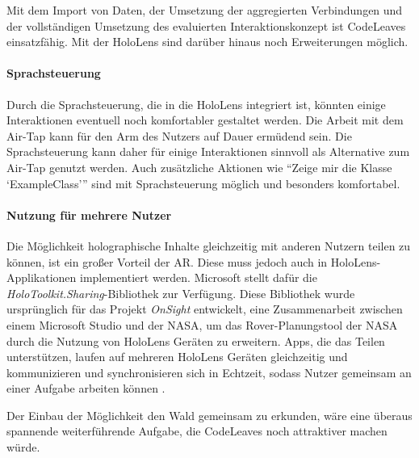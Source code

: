Mit dem Import von Daten, der Umsetzung der aggregierten Verbindungen und der vollständigen Umsetzung des evaluierten Interaktionskonzept ist CodeLeaves einsatzfähig. Mit der HoloLens sind darüber hinaus noch Erweiterungen möglich.

\paragraph*{Sprachsteuerung}

Durch die Sprachsteuerung, die in die HoloLens integriert ist, könnten einige Interaktionen eventuell noch komfortabler gestaltet werden. Die Arbeit mit dem Air-Tap kann für den Arm des Nutzers auf Dauer ermüdend sein. Die Sprachsteuerung kann daher für einige Interaktionen sinnvoll als Alternative zum Air-Tap genutzt werden. Auch zusätzliche Aktionen wie "`Zeige mir die Klasse \enquote*{ExampleClass}"' sind mit Sprachsteuerung möglich und besonders komfortabel.

\paragraph*{Nutzung für mehrere Nutzer}
Die Möglichkeit holographische Inhalte gleichzeitig mit anderen Nutzern teilen zu können, ist ein großer Vorteil der AR. Diese muss jedoch auch in HoloLens-Applikationen implementiert werden. Microsoft stellt dafür die \textit{HoloToolkit.Sharing}-Bibliothek zur Verfügung. Diese Bibliothek wurde ursprünglich für das Projekt \textit{OnSight} entwickelt, eine Zusammenarbeit zwischen einem Microsoft Studio und der NASA, um das Rover-Planungstool der NASA durch die Nutzung von HoloLens Geräten zu erweitern. Apps, die das Teilen unterstützen, laufen auf mehreren HoloLens Geräten gleichzeitig und kommunizieren und synchronisieren sich in Echtzeit, sodass Nutzer gemeinsam an einer Aufgabe arbeiten können \cite{microsoft2017sharing}.

Der Einbau der Möglichkeit den Wald gemeinsam zu erkunden, wäre eine überaus spannende weiterführende Aufgabe, die CodeLeaves noch attraktiver machen würde.\\


  